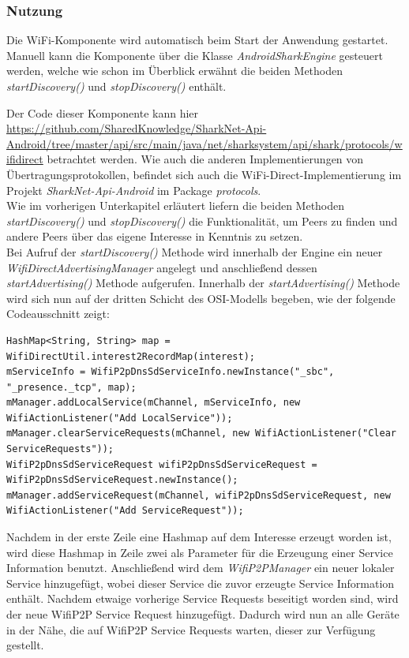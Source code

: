 \subsubsection{Nutzung}
Die WiFi-Komponente wird automatisch beim Start der Anwendung gestartet. Manuell kann die Komponente über die Klasse \textit{AndroidSharkEngine} gesteuert werden, welche wie schon im Überblick erwähnt die beiden Methoden \textit{startDiscovery()} und \textit{stopDiscovery()} enthält.


Der Code dieser Komponente kann hier \url{https://github.com/SharedKnowledge/SharkNet-Api-Android/tree/master/api/src/main/java/net/sharksystem/api/shark/protocols/wifidirect} betrachtet werden. Wie auch die anderen Implementierungen von Übertragungsprotokollen, befindet sich auch die WiFi-Direct-Implementierung im Projekt \textit{SharkNet-Api-Android} im Package \textit{protocols}.
\\Wie im vorherigen Unterkapitel erläutert liefern die beiden Methoden \textit{startDiscovery()} und \textit{stopDiscovery()} die Funktionalität, um Peers zu finden und andere Peers über das eigene Interesse in Kenntnis zu setzen. 
\\Bei Aufruf der \textit{startDiscovery()} Methode wird innerhalb der Engine ein neuer \textit{WifiDirectAdvertisingManager} angelegt und anschließend dessen \textit{startAdvertising()} Methode aufgerufen. Innerhalb der \textit{startAdvertising()} Methode wird sich nun auf der dritten Schicht des OSI-Modells begeben, wie der folgende Codeausschnitt zeigt:
\lstset{language=Java, caption=Hinzufügung des Services, label=DescriptiveLabel, numbers=left, numbersep=1em, breaklines=true, basicstyle=\small}
\begin{lstlisting}
HashMap<String, String> map = WifiDirectUtil.interest2RecordMap(interest);
mServiceInfo = WifiP2pDnsSdServiceInfo.newInstance("_sbc", "_presence._tcp", map);
mManager.addLocalService(mChannel, mServiceInfo, new WifiActionListener("Add LocalService"));
mManager.clearServiceRequests(mChannel, new WifiActionListener("Clear ServiceRequests"));
WifiP2pDnsSdServiceRequest wifiP2pDnsSdServiceRequest = WifiP2pDnsSdServiceRequest.newInstance();
mManager.addServiceRequest(mChannel, wifiP2pDnsSdServiceRequest, new WifiActionListener("Add ServiceRequest"));
\end{lstlisting}
Nachdem in der erste Zeile eine Hashmap auf dem Interesse erzeugt worden ist, wird diese Hashmap in Zeile zwei als Parameter für die Erzeugung einer Service Information benutzt. Anschließend wird dem \textit{WifiP2PManager} ein neuer lokaler Service hinzugefügt, wobei dieser Service die zuvor erzeugte Service Information enthält. Nachdem etwaige vorherige Service Requests beseitigt worden sind, wird der neue WifiP2P Service Request hinzugefügt. Dadurch wird nun an alle Geräte in der Nähe, die auf WifiP2P Service Requests warten, dieser zur Verfügung gestellt.
